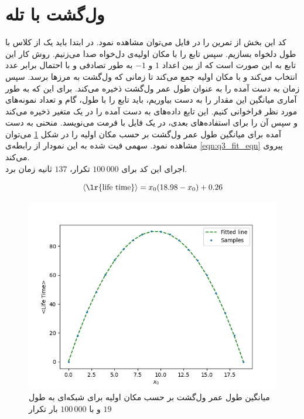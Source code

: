 \documentclass[11pt, a4paper]{article}
\begin{document}
\section{\textbf{ول‌گشت با تله}}
کد این بخش از تمرین را در فایل
می‌توان مشاهده نمود.
در ابتدا باید یک
از کلاس
با طول دلخواه بسازیم.
سپس تابع
را با مکان اولیه‌ی دل‌خواه صدا می‌زنیم.
روش کار این تابع به این صورت است که از بین اعداد
$1$
و
$-1$
به طور تصادفی و با احتمال برابر عدد انتخاب می‌کند و با مکان اولیه جمع می‌کند
تا زمانی که ول‌گشت به مرز‌ها برسد.
سپس زمان به دست آمده را به عنوان طول عمر ول‌گشت ذخیره می‌کند.
برای این که به طور آماری میانگین این مقدار را به دست بیاوریم، باید تابع
را با طول، گام و تعداد نمونه‌های مورد نظر فراخوانی کنیم.
این تابع داده‌های به دست آمده را در یک متغیر ذخیره می‌کند و سپس آن را برای استفاده‌های بعدی،
در یک فایل با فرمت
می‌نویسد.
منحنی به دست آمده برای میانگین طول عمر ول‌گشت بر حسب مکان اولیه را در شکل‌
\ref{fig:q3_life_time}
می‌توان مشاهده نمود.
سهمی فیت شده به این نمودار از رابطه‌ی
\eqref{eqn:q3_fit_eqn}
پیروی می‌کند.
\\
اجرای این کد برای
$100\,000$
تکرار،
$137$
ثانیه زمان برد.

\begin{equation}
  \braket{\text{\lr{life time}}} = x_0 (18.98 - x_0) + 0.26
  \label{eqn:q3_fit_eqn}
\end{equation}

\begin{figure}[h]
  \centering
  \includegraphics[width=.7\textwidth]{q3_life_time_20_1_100000.png}
  \caption{میانگین طول عمر ول‌گشت بر حسب مکان اولیه برای شبکه‌ای به طول $19$ و با $100\,000$ بار تکرار}
  \label{fig:q3_life_time}
\end{figure}
\end{document}

